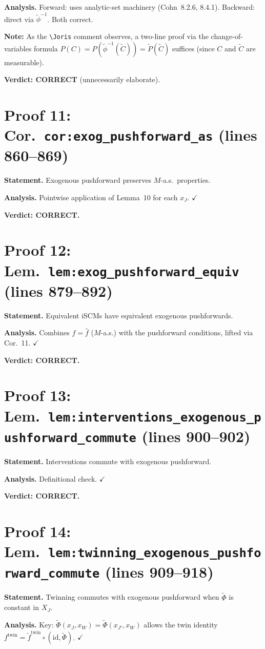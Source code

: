 \documentclass{article}
\begin{document}
\textbf{Analysis.} Forward: uses analytic-set machinery (Cohn~8.2.6, 8.4.1).
Backward: direct via $\tilde\phi^{-1}$.  Both correct.

\textbf{Note:} As the \verb|\Joris| comment observes, a two-line proof via the
change-of-variables formula $P(C)=P(\tilde\phi^{-1}(\tilde C))=\tilde P(\tilde C)$
suffices (since $C$ and $\tilde C$ are measurable).

\textbf{Verdict: CORRECT} (unnecessarily elaborate).

\section{Proof 11: Cor.\ \texttt{cor:exog\_pushforward\_as} (lines 860--869)}
\textbf{Statement.} Exogenous pushforward preserves $M$-a.s.\ properties.

\textbf{Analysis.} Pointwise application of Lemma~10 for each $x_J$.  $\checkmark$

\textbf{Verdict: CORRECT.}

\section{Proof 12: Lem.\ \texttt{lem:exog\_pushforward\_equiv} (lines 879--892)}
\textbf{Statement.} Equivalent iSCMs have equivalent exogenous pushforwards.

\textbf{Analysis.} Combines $f=\hat f$ ($M$-a.s.) with the pushforward
conditions, lifted via Cor.~11.  $\checkmark$

\textbf{Verdict: CORRECT.}

\section{Proof 13: Lem.\ \texttt{lem:interventions\_exogenous\_pushforward\_commute}
(lines 900--902)}
\textbf{Statement.} Interventions commute with exogenous pushforward.

\textbf{Analysis.} Definitional check.  $\checkmark$

\textbf{Verdict: CORRECT.}

\section{Proof 14: Lem.\ \texttt{lem:twinning\_exogenous\_pushforward\_commute}
(lines 909--918)}
\textbf{Statement.} Twinning commutes with exogenous pushforward when
$\tilde\Phi$ is constant in $X_J$.

\textbf{Analysis.} Key: $\tilde\Phi(x_J,x_W)=\tilde\Phi(x_{J'},x_W)$
allows the twin identity $f^{\mathrm{twin}}=\tilde f^{\mathrm{twin}}\circ
(\mathrm{id},\tilde\Phi)$.  $\checkmark$
\end{document}
